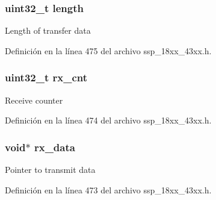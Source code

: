 \subsubsection[{\texorpdfstring{length}{length}}]{\setlength{\rightskip}{0pt plus 5cm}uint32\+\_\+t length}\hypertarget{struct_chip___s_s_p___d_a_t_a___s_e_t_u_p___t_aebb70c2aab3407a9f05334c47131a43b}{}\label{struct_chip___s_s_p___d_a_t_a___s_e_t_u_p___t_aebb70c2aab3407a9f05334c47131a43b}
Length of transfer data 

Definición en la línea 475 del archivo ssp\+\_\+18xx\+\_\+43xx.\+h.

\subsubsection[{\texorpdfstring{rx\+\_\+cnt}{rx_cnt}}]{\setlength{\rightskip}{0pt plus 5cm}uint32\+\_\+t rx\+\_\+cnt}\hypertarget{struct_chip___s_s_p___d_a_t_a___s_e_t_u_p___t_a3b1e23a496d25dd87f7b1f223fe0d60c}{}\label{struct_chip___s_s_p___d_a_t_a___s_e_t_u_p___t_a3b1e23a496d25dd87f7b1f223fe0d60c}
Receive counter 

Definición en la línea 474 del archivo ssp\+\_\+18xx\+\_\+43xx.\+h.

\subsubsection[{\texorpdfstring{rx\+\_\+data}{rx_data}}]{\setlength{\rightskip}{0pt plus 5cm}void$\ast$ rx\+\_\+data}\hypertarget{struct_chip___s_s_p___d_a_t_a___s_e_t_u_p___t_a145057319bd95286db0e0ad0e635f93f}{}\label{struct_chip___s_s_p___d_a_t_a___s_e_t_u_p___t_a145057319bd95286db0e0ad0e635f93f}
Pointer to transmit data 

Definición en la línea 473 del archivo ssp\+\_\+18xx\+\_\+43xx.\+h.


